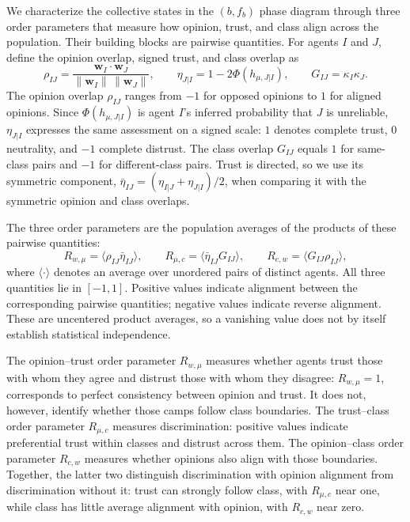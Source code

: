 \documentclass{article}
\newcommand{\Rwmu}{R_{w,\mu}}
\newcommand{\Rmuc}{R_{\mu,c}}
\newcommand{\Rcw}{R_{c,w}}
\begin{document}
We characterize the collective states in the $(b,f_b)$ phase diagram through
three order parameters that measure how opinion, trust, and class align across
the population. Their building blocks are pairwise quantities. For agents $I$
and $J$, define the opinion overlap, signed trust, and class overlap as
%
\begin{equation}
\rho_{IJ}= \frac{\mathbf{w}_I\cdot\mathbf{w}_J}
        {\|\mathbf{w}_I\|\,\|\mathbf{w}_J\|},\qquad
\eta_{J|I}= 1-2\Phi(h_{\mu,J|I}),\qquad
G_{IJ}= \kappa_I\kappa_J.
\label{eq:pairwise}
\end{equation}
%
The opinion overlap $\rho_{IJ}$ ranges from $-1$ for opposed opinions to $1$
for aligned opinions. Since $\Phi(h_{\mu,J|I})$ is agent $I$'s inferred
probability that $J$ is unreliable, $\eta_{J|I}$ expresses the same assessment
on a signed scale: $1$ denotes complete trust, $0$ neutrality, and $-1$
complete distrust. The class overlap $G_{IJ}$ equals $1$ for same-class pairs
and $-1$ for different-class pairs. Trust is directed, so we use its symmetric
component, $\bar{\eta}_{IJ}=(\eta_{I|J}+\eta_{J|I})/2$, when comparing it with
the symmetric opinion and class overlaps.

The three order parameters are the population averages of the products of
these pairwise quantities:
%
\begin{equation}
\Rwmu = \bigl\langle \rho_{IJ}\bar{\eta}_{IJ}\bigr\rangle,\qquad
\Rmuc = \bigl\langle \bar{\eta}_{IJ}G_{IJ}\bigr\rangle,\qquad
\Rcw  = \bigl\langle G_{IJ}\rho_{IJ}\bigr\rangle,
\label{eq:correlations}
\end{equation}
%
where $\langle\cdot\rangle$ denotes an average over unordered pairs of distinct
agents. All three quantities lie in $[-1,1]$. Positive values indicate
alignment between the corresponding pairwise quantities; negative values
indicate reverse alignment. These are uncentered product averages, so a
vanishing value does not by itself establish statistical independence.

The opinion--trust order parameter $\Rwmu$ measures whether agents trust those with whom they agree and distrust those with whom they disagree: $\Rwmu=1$, corresponds to perfect consistency between opinion and trust. It does not, however, identify whether those camps follow class boundaries. The trust--class order parameter $\Rmuc$ measures discrimination: positive values indicate preferential trust within classes and distrust across them. The opinion--class order parameter $\Rcw$ measures whether opinions also align with those boundaries. Together, the latter two distinguish discrimination with opinion alignment from discrimination without it: trust can strongly follow class, with $\Rmuc$ near one, while class has little average alignment
with opinion, with $\Rcw$ near zero.
\end{document}
